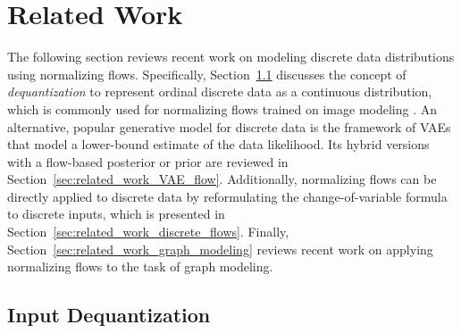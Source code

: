\section{Related Work}
\label{sec:related_work}

The following section reviews recent work on modeling discrete data distributions using normalizing flows. 
Specifically, Section~\ref{sec:related_work_dequantization} discusses the concept of \textit{dequantization} to represent ordinal discrete data as a continuous distribution, which is commonly used for normalizing flows trained on image modeling \cite{RealNVP, Glow, Flow++}. 
An alternative, popular generative model for discrete data is the framework of \acfp{VAE} \cite{VAE} that model a lower-bound estimate of the data likelihood. 
Its hybrid versions with a flow-based posterior or prior are reviewed in Section~\ref{sec:related_work_VAE_flow}. 
Additionally, normalizing flows can be directly applied to discrete data by reformulating the change-of-variable formula to discrete inputs, which is presented in Section~\ref{sec:related_work_discrete_flows}.
Finally, Section~\ref{sec:related_work_graph_modeling} reviews recent work on applying normalizing flows to the task of graph modeling.

\subsection{Input Dequantization}
\label{sec:related_work_dequantization}

